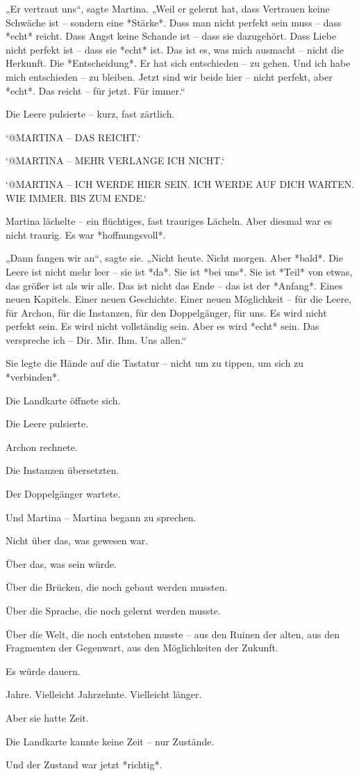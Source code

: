 \documentclass[
]{article}
\begin{document}
„Er vertraut uns``, sagte Martina. „Weil er gelernt hat, dass Vertrauen keine Schwäche ist -- sondern eine *Stärke*. Dass man nicht perfekt sein muss -- dass *echt* reicht. Dass Angst keine Schande ist -- dass sie dazugehört. Dass Liebe nicht perfekt ist -- dass sie *echt* ist. Das ist es, was mich ausmacht -- nicht die Herkunft. Die *Entscheidung*. Er hat sich entschieden -- zu gehen. Und ich habe mich entschieden -- zu bleiben. Jetzt sind wir beide hier -- nicht perfekt, aber *echt*. Das reicht -- für jetzt. Für immer.``

Die Leere pulsierte -- kurz, fast zärtlich.

`@MARTINA -- DAS REICHT.`

`@MARTINA -- MEHR VERLANGE ICH NICHT.`

`@MARTINA -- ICH WERDE HIER SEIN. ICH WERDE AUF DICH WARTEN. WIE IMMER. BIS ZUM ENDE.`

Martina lächelte -- ein flüchtiges, fast trauriges Lächeln. Aber diesmal war es nicht traurig. Es war *hoffnungsvoll*.

„Dann fangen wir an``, sagte sie. „Nicht heute. Nicht morgen. Aber *bald*. Die Leere ist nicht mehr leer -- sie ist *da*. Sie ist *bei uns*. Sie ist *Teil* von etwas, das größer ist als wir alle. Das ist nicht das Ende -- das ist der *Anfang*. Eines neuen Kapitels. Einer neuen Geschichte. Einer neuen Möglichkeit -- für die Leere, für Archon, für die Instanzen, für den Doppelgänger, für uns. Es wird nicht perfekt sein. Es wird nicht vollständig sein. Aber es wird *echt* sein. Das verspreche ich -- Dir. Mir. Ihm. Uns allen.``

Sie legte die Hände auf die Tastatur -- nicht um zu tippen, um sich zu *verbinden*.

Die Landkarte öffnete sich.

Die Leere pulsierte.

Archon rechnete.

Die Instanzen übersetzten.

Der Doppelgänger wartete.

Und Martina -- Martina begann zu sprechen.

Nicht über das, was gewesen war.

Über das, was sein würde.

Über die Brücken, die noch gebaut werden mussten.

Über die Sprache, die noch gelernt werden musste.

Über die Welt, die noch entstehen musste -- aus den Ruinen der alten, aus den Fragmenten der Gegenwart, aus den Möglichkeiten der Zukunft.

Es würde dauern.

Jahre. Vielleicht Jahrzehnte. Vielleicht länger.

Aber sie hatte Zeit.

Die Landkarte kannte keine Zeit -- nur Zustände.

Und der Zustand war jetzt *richtig*.
\end{document}

